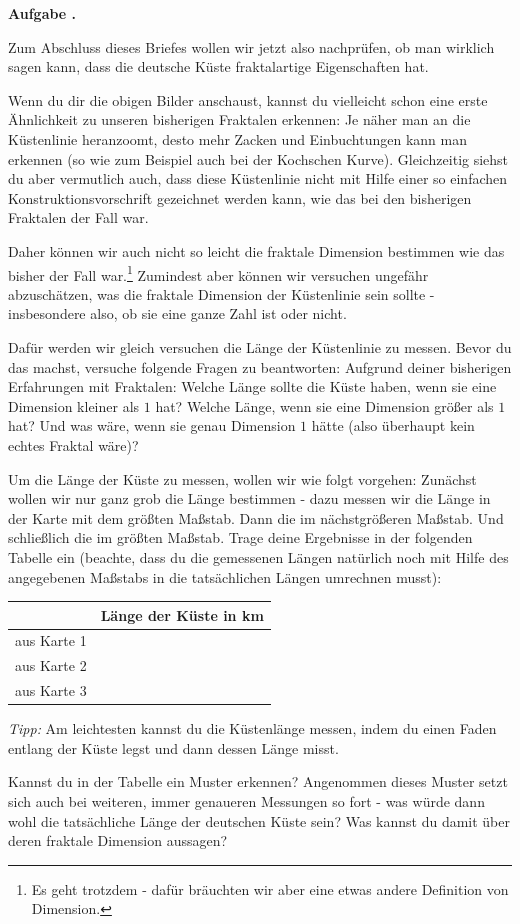 \documentclass[a4paper,ngerman,12pt]{scrartcl}
\theoremstyle{definition}
\theoremstyle{plain}
\theoremstyle{remark}
\newlength{\aufgabenskip}
\newcounter{aufgabennummer}
\newenvironment{aufgabe}[1]{
  \addtocounter{aufgabennummer}{1}
  \textbf{Aufgabe \theaufgabennummer.} \emph{#1} \par
}{\vspace{\aufgabenskip}}
\begin{document}
\begin{aufgabe}{}
Zum Abschluss dieses Briefes wollen wir jetzt also nachprüfen, ob man wirklich sagen kann, dass die deutsche Küste \glqq fraktalartige Eigenschaften\grqq{} hat. 

Wenn du dir die obigen Bilder anschaust, kannst du vielleicht schon eine erste Ähnlichkeit zu unseren bisherigen Fraktalen erkennen: Je näher man an die Küstenlinie heranzoomt, desto mehr Zacken und Einbuchtungen kann man erkennen (so wie zum Beispiel auch bei der Kochschen Kurve). Gleichzeitig siehst du aber vermutlich auch, dass diese Küstenlinie nicht mit Hilfe einer so einfachen Konstruktionsvorschrift gezeichnet werden kann, wie das bei den bisherigen Fraktalen der Fall war.

Daher können wir auch nicht so leicht die fraktale Dimension bestimmen wie das bisher der Fall war.\footnote{Es geht trotzdem - dafür bräuchten wir aber eine etwas andere Definition von Dimension.} Zumindest aber können wir versuchen ungefähr abzuschätzen, was die fraktale Dimension der Küstenlinie sein sollte - insbesondere also, ob sie eine ganze Zahl ist oder nicht.

Dafür werden wir gleich versuchen die Länge der Küstenlinie zu messen. Bevor du das machst, versuche folgende Fragen zu beantworten: Aufgrund deiner bisherigen Erfahrungen mit Fraktalen: Welche Länge sollte die Küste haben, wenn sie eine Dimension kleiner als $1$ hat? Welche Länge, wenn sie eine Dimension größer als $1$ hat? Und was wäre, wenn sie genau Dimension $1$ hätte (also überhaupt kein echtes Fraktal wäre)?

Um die Länge der Küste zu messen, wollen wir wie folgt vorgehen: Zunächst wollen wir nur ganz grob die Länge bestimmen - dazu messen wir die Länge in der Karte mit dem größten Maßstab. Dann die im nächstgrößeren Maßstab. Und schließlich die im größten Maßstab. Trage deine Ergebnisse in der folgenden Tabelle ein (beachte, dass du die gemessenen Längen natürlich noch mit Hilfe des angegebenen Maßstabs in die tatsächlichen Längen umrechnen musst):

\begin{center}
	\renewcommand{\arraystretch}{2}
	\begin{tabular}{l||c}
		& Länge der Küste in \unit{km} \\\hline\hline
		aus Karte 1 & \\\hline
		aus Karte 2 & \\\hline
		aus Karte 3 &
	\end{tabular}
\end{center}


\emph{Tipp:} Am leichtesten kannst du die Küstenlänge messen, indem du einen Faden entlang der Küste legst und dann dessen Länge misst.

Kannst du in der Tabelle ein Muster erkennen? Angenommen dieses Muster setzt sich auch bei weiteren, immer genaueren Messungen so fort - was würde dann wohl die tatsächliche Länge der deutschen Küste sein? Was kannst du damit über deren fraktale Dimension aussagen?
\end{aufgabe}
\end{document}
